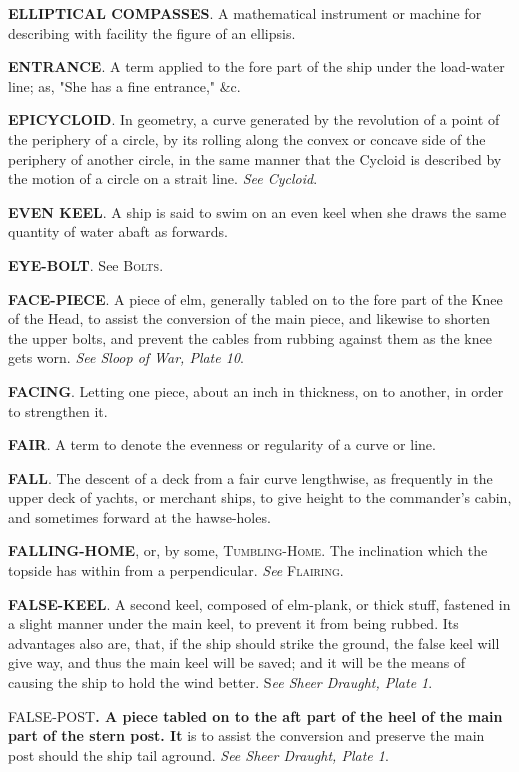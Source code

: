 \textbf{ELLIPTICAL COMPASSES}. A mathematical instrument or machine for describing with facility the figure of an ellipsis. 

\textbf{ENTRANCE}. A term applied to the fore part of the ship under the load-water line; as, "She has a fine entrance," \&c. 

\textbf{EPICYCLOID}. In geometry, a curve generated by the revolution of a point of the periphery of a circle, by its rolling along the convex or concave side of the periphery of another circle, in the same manner that the Cycloid is described by the motion of a circle on a strait line. \textit{See Cycloid}. 

\textbf{EVEN KEEL}. A ship is said to swim on an even keel when she draws the same quantity of water abaft as forwards. 

\textbf{EYE-BOLT}. See\textsc{ Bolts}. 

\textbf{FACE-PIECE}. A piece of elm, generally tabled on to the fore part of the Knee of the Head, to assist the conversion of the main piece, and likewise to shorten the upper bolts, and prevent the cables from rubbing against them as the knee gets worn. \textit{See Sloop of War, Plate 10}. 

\textbf{FACING}. Letting one piece, about an inch in thickness, on to another, in order to strengthen it. 

\textbf{FAIR}. A term to denote the evenness or regularity of a curve or line. 

\textbf{FALL}. The descent of a deck from a fair curve lengthwise, as frequently in the upper deck of yachts, or merchant ships, to give height to the commander's cabin, and sometimes forward at the hawse-holes. 

\textbf{FALLING-HOME}, or, by some, \textsc{Tumbling-Home}. The inclination which the topside has within from a perpendicular. \textit{See} \textsc{Flairing}. 

\textbf{FALSE-KEEL}. A second keel, composed of elm-plank, or thick stuff, fastened in a slight manner under the main keel, to prevent it from being rubbed. Its advantages also are, that, if the ship should strike the ground, the false keel will give way, and thus the main keel will be saved; and it will be the means of causing the ship to hold the wind better. S\textit{ee Sheer Draught, Plate 1}. 

FALSE-POST\textbf{. A piece tabled on to the aft part of the heel of the main part of the stern post. It }is to assist the conversion and preserve the main post should the ship tail aground. \textit{See Sheer Draught, Plate 1}. 

